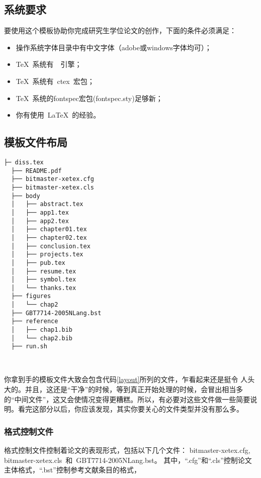 \subsection{系统要求}
\label{sec:requirements}

要使用这个模板协助你完成研究生学位论文的创作，下面的条件必须满足：

\begin{itemize}
\item \inv 操作系统字体目录中有中文字体（adobe或windows字体均可）；
\item \inv \TeX~系统有~\XeTeX~引擎；
\item \inv \TeX~系统有~ctex~宏包；
\item \inv \TeX~系统的fontspec宏包(fontspec.sty)足够新；
\item \inv 你有使用~\LaTeX~的经验。
\end{itemize}

 
\subsection{模板文件布局}
\label{sec:layout}

\begin{lstlisting}[basicstyle=\small\ttfamily,caption={模板文件布局},label=layout,float,numbers=none]
  ├─ diss.tex
  ├── README.pdf
  ├── bitmaster-xetex.cfg
  ├── bitmaster-xetex.cls
  ├── body
  │   ├── abstract.tex
  │   ├── app1.tex
  │   ├── app2.tex
  │   ├── chapter01.tex
  │   ├── chapter02.tex
  │   ├── conclusion.tex
  │   ├── projects.tex
  │   ├── pub.tex
  │   ├── resume.tex
  │   ├── symbol.tex
  │   └── thanks.tex
  ├── figures
  │   └── chap2
  ├── GBT7714-2005NLang.bst
  ├── reference
  │   ├── chap1.bib
  │   └── chap2.bib
  ├── run.sh
  
      
\end{lstlisting}

你拿到手的模板文件大致会包含代码\ref{layout}所列的文件，乍看起来还是挺令
人头大的。并且，这还是“干净”的时候，等到真正开始处理的时候，会冒出相当多
的“中间文件”，这又会使情况变得更糟糕。所以，有必要对这些文件做一些简要说
明。看完这部分以后，你应该发现，其实你要关心的文件类型并没有那么多。

\subsubsection{格式控制文件}
\label{sec:format}

格式控制文件控制着论文的表现形式，包括以下几个文件：
bitmaster-xetex.cfg, bitmaster-xetex.cls~和~GBT7714-2005NLang.bst。
其中，``.cfg''和``.cls''控制论文主体格式，``.bst''控制参考文献条目的格式，

